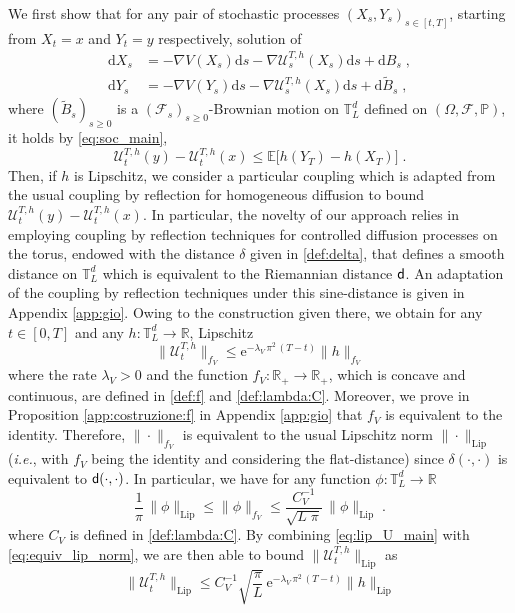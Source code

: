 \documentclass[final,12pt]{colt2023} %
\def\rset{\mathbb{R}}
\def\ie{\textit{i.e.}}
\newcommand{\De}{\mathrm{d}}
\newcommand{\rme}{\mathrm{e}}
\newcommand{\sfd}{{\sf d}}
\def\torus{\tset}
\def\torusL{\torus_L}
\def\rset{\mathbb{R}}
\def\tset{\mathbb{T}}
\def\ie{\textit{i.e.}}
\def\eqsp{\;}
\def\rmd{\mathrm{d}}
\def\PP{\mathbb{P}}
\def\mcf{\mathcal{F}}
\begin{document}
We first show that for any pair of stochastic processes $(X_s,Y_s)_{s \in [t,T]}$, starting from $X_t=x$ and $Y_t=y$ respectively, solution of
\begin{align}
  \label{eq:2}
  \De X_s&=-\nabla V (X_s)\De s-\nabla \mathcal{U}^{T,h}_s(X_s)\De s+\De B_s\eqsp, \\
  \De Y_s&= - \nabla V(Y_s) \rmd s -\nabla \mathcal{U}^{T,h}_s(X_s)\De s+\De \tilde{B}_s \eqsp,
\end{align}
where $(\tilde{B}_s)_{s \geq 0}$ is a $(\mcf_s)_{s \geq 0}$-Brownian motion on $\torusL^d$ defined on $(\Omega,\mcf,\PP)$, it holds by \eqref{eq:soc_main},
 \begin{equation}
 \mathcal{U}^{T,h}_t(y)-\mathcal{U}^{T,h}_t(x)\leq
 \mathbb{E}\biggl[h(Y_T)-h(X_T)\biggr] \eqsp.
\end{equation}
Then, if $h$ is Lipschitz, we consider a particular coupling which is adapted from the usual  coupling by reflection for homogeneous diffusion \citep{wang1994neumann,eberle2016reflection}  to bound $ \mathcal{U}^{T,h}_t(y)-\mathcal{U}^{T,h}_t(x)$. In particular, the novelty of our approach relies in employing coupling by reflection techniques for controlled diffusion processes on the torus, endowed with the distance $\delta$ given in \eqref{def:delta}, that defines a smooth distance on $\mathbb{T}_L^d$ which is equivalent to the Riemannian distance $\sfd$. An adaptation of the coupling by reflection techniques under this sine-distance is given in Appendix \ref{app:gio}. Owing to the construction given there,
we obtain for any $t\in[0,T]$ and any $h : \torus_L^d \to \rset$, Lipschitz 
\begin{equation}
\| \mathcal{U}^{T,h}_t\|_{f_V}\leq \rme^{-\lambda_V \,\pi^2\,(T-t)}\|h\|_{f_V}
\label{eq:lip_U_main}
\end{equation}
where the rate $\lambda_V >0$ and the function $f_V:  \rset_+ \to \rset_+$, which is concave and continuous, are defined in \eqref{def:f} and \eqref{def:lambda:C}. 
Moreover, we prove in Proposition \ref{app:costruzione:f} in Appendix \ref{app:gio} that $f_V$ is equivalent to the identity. Therefore, $\| \cdot \|_{f_V}$ is equivalent to the usual Lipschitz norm $ \|\cdot \|_{\mathrm{Lip}}$ (\ie, with $f_V$ being the identity and considering the flat-distance) since $\delta(\cdot,\cdot)$ is equivalent to $\sfd(\cdot,\cdot)$. In particular, we have for any function $\phi : \torusL^d \to \rset$
\begin{equation}
\frac{1}{\pi}\,\|\phi\|_{\mathrm{Lip}}\leq \|\phi\|_{f_V}\leq \frac{C_V^{-1}}{\sqrt{L\eqsp \pi}}\,\|\phi\|_{\mathrm{Lip}}\eqsp.
\label{eq:equiv_lip_norm}
\end{equation}
where $C_V$ is defined in \eqref{def:lambda:C}. By combining \eqref{eq:lip_U_main} with \eqref{eq:equiv_lip_norm}, we are then able to bound $\|\mathcal{U}^{T,h}_t\|_{\mathrm{Lip}}$ as
\begin{equation}\label{eq:contr:type}
\| \mathcal{U}^{T,h}_t\|_{\mathrm{Lip}}\leq C_V^{-1}\sqrt{\frac{\pi}{L}}\,\rme^{-\lambda_V \,\pi^2\,(T-t)}\|h\|_{\mathrm{Lip}}
\end{equation}
\end{document}
